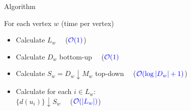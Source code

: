 \documentclass[18pt]{beamer}
\begin{document}
\begin{frame}{Algorithm}
    \begin{minipage}[t]{0.49\textwidth}
    	
    	For each vertex $w$ (time per vertex)
    	\begin{itemize}
    		\item Calculate $L_w$   \ \ ($\color{blue}\mathcal{O}(1)$)
    		\item Calculate $D_w$ bottom-up \ \ ($\color{blue}\mathcal{O}(1)$
    		\item Calculate $S_w = D_w \downarrow M_w$ top-down  \ \ ($\color{blue}\mathcal{O}(\log|D_w| + 1)$)
    		\item Calculate for each $i \in L_w$: \\
    			  $\{d(u_i)\} \downarrow S_w$ \ \ ($\color{blue} \mathcal{O}(|L_w|)$)
    		

\end{itemize}
\end{minipage}
\end{frame}
\end{document}
